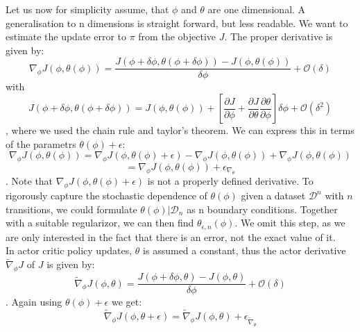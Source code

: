 Let us now for simplicity assume, that $\phi$ and $\theta$ are one dimensional. A generalisation to n dimensions is straight forward, but less readable. We want 
to estimate the update error to $\pi$ from the objective $J$. The proper derivative is given by:
\begin{equation}
    \nabla_{\phi} J(\phi, \theta(\phi)) = \frac{J(\phi + \delta \phi, \theta(\phi + \delta \phi)) - J(\phi, \theta(\phi))}{\delta \phi} + \mathcal{O}(\delta)
\end{equation}
with 
\begin{equation}
    J(\phi + \delta \phi, \theta(\phi + \delta \phi)) = J(\phi, \theta(\phi)) + \left[ 
        \frac{\partial J}{\partial \phi} + \frac{\partial J}{\partial \theta} \frac{\partial \theta}{\partial \phi}
    \right] \delta \phi  + \mathcal{O}(\delta^2)
\end{equation}
, where we used the chain rule and taylor's theorem. 
We can express this in terms of the parametrs $\theta(\phi) + \epsilon$:
\begin{equation}
    \nabla_{\phi} J(\phi, \theta(\phi)) = \nabla_{\phi} J(\phi, \theta(\phi) + \epsilon) - \nabla_{\phi} J(\phi, \theta(\phi)) + \nabla_{\phi} J(\phi, \theta(\phi))
\end{equation}
\begin{equation*}
    = \nabla_{\phi} J(\phi, \theta(\phi)) + \epsilon_{\nabla_{\theta}}
\end{equation*}
. Note that $\nabla_{\phi} J(\phi, \theta(\phi) + \epsilon)$ is not a properly defined derivative. To rigorously capture the stochastic dependence of $\theta(\phi)$ 
given a dataset $\mathcal{D}^n$ with $n$ transitions, 
we could formulate $\theta(\phi)|\mathcal{D}_n$ as n boundary conditions. Together with a suitable regularizor, we can then find $\theta_{\epsilon, n}(\phi)$. We omit 
this step, as we are only interested in the fact that there is an error, not the exact value of it.\\
In actor critic policy updates, $\theta$ is assumed a constant, thus the actor derivative 
$\widetilde{\nabla}_\phi J$ of $J$ is given by:
\begin{equation}
    \widetilde{\nabla}_\phi J(\phi, \theta) =  \frac{J(\phi + \delta \phi, \theta) - J(\phi, \theta)}{\delta \phi} + \mathcal{O}(\delta)
\end{equation}
. 
Again using $\theta(\phi) + \epsilon$ we get:
\begin{equation}
    \widetilde{\nabla}_\phi J(\phi, \theta + \epsilon) = \widetilde{\nabla}_\phi J(\phi, \theta) + \epsilon_{\widetilde{\nabla}_{\theta}}
\end{equation}
